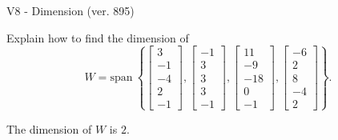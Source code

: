 \begin{exercise}
  \begin{exerciseTitle}V8 - Dimension (ver. 895)\end{exerciseTitle}
  \begin{exerciseStatement}
    Explain how to find the dimension of 
\[W=\mathrm{span}\ \left\{\left[\begin{array}{r}
3 \\
-1 \\
-4 \\
2 \\
-1
\end{array}\right] , \left[\begin{array}{r}
-1 \\
3 \\
3 \\
3 \\
-1
\end{array}\right] , \left[\begin{array}{r}
11 \\
-9 \\
-18 \\
0 \\
-1
\end{array}\right] , \left[\begin{array}{r}
-6 \\
2 \\
8 \\
-4 \\
2
\end{array}\right]\right\}.\]



  \end{exerciseStatement}
  \begin{exerciseAnswer}
   The dimension of \(W\) is  \(2\).
  


  \end{exerciseAnswer}
\end{exercise}